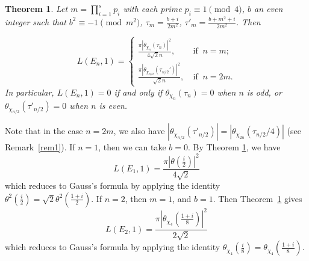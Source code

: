 \documentclass[11pt, reqno]{amsart}
\theoremstyle{plain}
\newtheorem{theorem}{Theorem}[section]
\theoremstyle{definition}
\numberwithin{equation}{section}
\begin{document}
\begin{theorem}\label{Theorem1.1}
Let  $m=\prod_{i=1}^s p_i$ with  each prime $p_i\equiv1\pmod{4}$, $b$  an even integer such that $b^2\equiv -1\pmod{m^2}$, $\tau_m=\frac{b+i}{2
m^2}$, $\tau'_{m}=\frac{b+m^2+i}{2
m^2}$. Then 

    \[
L(E_n,1)=\begin{cases}\displaystyle{\frac{\pi \left\lvert\theta_{\chi_{n}}\left(\tau_n\right)\right\rvert^2}{4\sqrt{2}n }},\ &\text{if }\ n=m;\\[1.5ex]
\displaystyle\frac{\pi \left\lvert\theta_{\chi_{n/2}}(\tau_{n/2}')\right\rvert^2}{\sqrt{2}n }  ,\ &\text{if }\ n=2m .
\end{cases}
\]
In particular, $L(E_n,1)=0$ if and only if $\theta_{\chi_{n}}\left(\tau_n\right)=0$ when $n$ is odd,  or $\theta_{\chi_{n/2}}(\tau'_{n/2})=0$  when $n$ is even.
\end{theorem}
 


Note that in the case $n=2m$, we also have $\left|\theta_{\chi_{n/2}}(\tau'_{n/2})\right|={\left|\theta_{\chi_{2n}}\left(\tau_{n/2}/4\right)\right|} $ (see Remark~\ref{rem1}). 
If $n=1$, then we can take   $b=0$. By Theorem \ref{Theorem1.1}, we have \[
L(E_1,1)=\frac{\pi \left|\theta\left(\frac{i}{2
}\right)\right|^2}{4\sqrt{2} }
\]
which reduces to  Gauss's  formula by applying 
  the identity $ \theta^2\left(\frac{i}{2}\right)= \sqrt{2}\theta^2\left(\frac{1+i}{2}\right)$. If $n=2$, then $m=1$, and $b=1$. Then Theorem~\ref{Theorem1.1} gives
\[
L(E_2,1)=\frac{\pi \left|\theta_{\chi_4}\left(\frac{1+i}{8
}\right)\right|^2}{2\sqrt{2} }
\]
which reduces to  Gauss's  formula by applying 
  the identity $ \theta_{\chi_4}\left(\frac{i}{8}\right)= \theta_{\chi_4}\left(\frac{1+i}{8}\right)$. 
\end{document}
